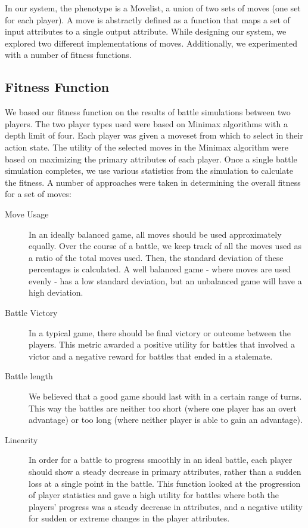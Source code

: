 \documentclass{acm_proc_article-sp}
\begin{document}
In our system, the phenotype is a Movelist, a union of two sets of moves (one set for each player). A move is abstractly defined as a function that maps a set of input attributes to a single output attribute. While designing our system, we explored two different implementations of moves. Additionally, we experimented with a number of fitness functions. 

\subsection{Fitness Function}

We based our fitness function on the results of battle simulations between two players.  The two player types used were based on Minimax algorithms with a depth limit of four. Each player was given a moveset from which to select in their action state. The utility of the selected moves in the Minimax algorithm were based on maximizing the primary attributes of each player.
Once a single battle simulation completes, we use various statistics from the simulation to calculate the fitness. A number of approaches were taken in determining the overall fitness for a set of moves:

\begin{description}
    \item[Move Usage] In an ideally balanced game, all moves should be used approximately equally. Over the course of a battle, we keep track of all the moves used as a ratio of the total moves used. Then, the standard deviation of these percentages is calculated. A well balanced game - where moves are used evenly - has a low standard deviation, but an unbalanced game will have a high deviation.
    \item[Battle Victory] In a typical game, there should be final victory or outcome between the players. This metric awarded a positive utility for battles that involved a victor and a negative reward for battles that ended in a stalemate.
    \item[Battle length] We believed that a good game should last with in a certain range of turns. This way the battles are neither too short (where one player has an overt advantage) or too long (where neither player is able to gain an advantage). 
    \item[Linearity] In order for a battle to progress smoothly in an ideal battle, each player should show a steady decrease in primary attributes, rather than a sudden loss at a single point in the battle. This function looked at the progression of player statistics and gave a high utility for battles where both the players’ progress was a steady decrease in attributes, and a negative utility for sudden or extreme changes in the player attributes.
\end{description}
\end{document}

